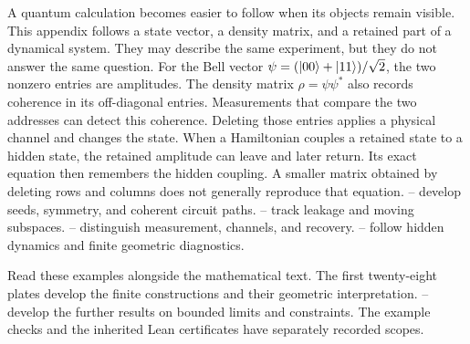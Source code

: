 \begingroup

\fontsize{10.5}{12.6}\selectfont
\setlength{\parskip}{4pt}
\setlength{\abovedisplayskip}{6pt}\setlength{\belowdisplayskip}{6pt}
A quantum calculation becomes easier to follow when its objects remain visible. This appendix follows a state vector, a density matrix, and a retained part of a dynamical system. They may describe the same experiment, but they do not answer the same question.
For the Bell vector $\psi=(\lvert 00\rangle+\lvert 11\rangle)/\sqrt2$, the two nonzero entries are amplitudes. The density matrix $\rho=\psi\psi^*$ also records coherence in its off-diagonal entries. Measurements that compare the two addresses can detect this coherence. Deleting those entries applies a physical channel and changes the state.
When a Hamiltonian couples a retained state to a hidden state, the retained amplitude can leave and later return. Its exact equation then remembers the hidden coupling. A smaller matrix obtained by deleting rows and columns does not generally reproduce that equation.
-- develop seeds, symmetry, and coherent circuit paths. -- track leakage and moving subspaces. -- distinguish measurement, channels, and recovery. -- follow hidden dynamics and finite geometric diagnostics.

Read these examples alongside the mathematical text. The first twenty-eight plates develop the finite constructions and their geometric interpretation. -- develop the further results on bounded limits and constraints. The example checks and the inherited Lean certificates have separately recorded scopes.

